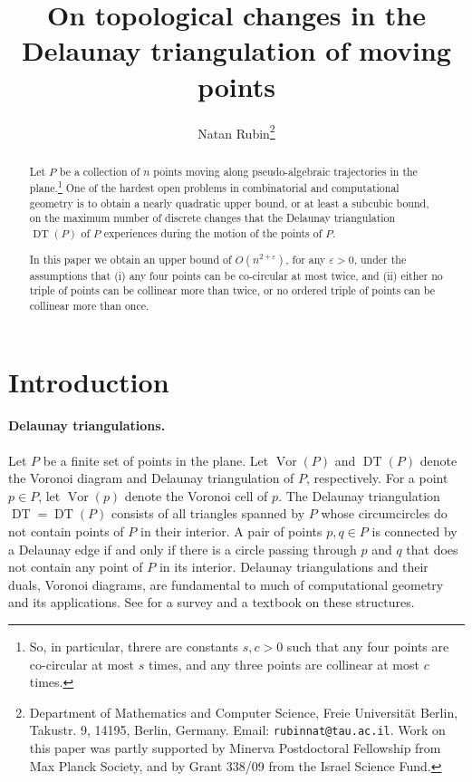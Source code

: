 \documentclass[letter,11pt]{article}
\def\eps{{\varepsilon}}
\def\eps{{\varepsilon}}
\def\DT{\mathop{\mathrm{DT}}}
\def\Vor{\mathop{\mathrm{Vor}}}
\begin{document}
\title{On topological changes in the Delaunay triangulation of moving points}
\author{Natan Rubin\thanks{Department of Mathematics and Computer Science, Freie Universit\"{a}t Berlin, Takustr. 9, 14195, Berlin, Germany.
Email: {\tt rubinnat@tau.ac.il}. Work on this paper was partly supported by Minerva Postdoctoral Fellowship from Max Planck Society, and by Grant 338/09 from the Israel Science Fund.}}


\maketitle
\begin{abstract}
Let $P$ be a collection of $n$ points moving along pseudo-algebraic trajectories in the plane.\footnote{So, in particular, threre are constants $s,c>0$ such that any four points are co-circular at most $s$ times, and any three points are collinear at most $c$ times.} 
One of the hardest open problems in combinatorial and computational geometry is to obtain a nearly quadratic upper bound, or at least a subcubic bound, on the maximum number of discrete changes that the Delaunay triangulation $\DT(P)$ of $P$ experiences during the motion of the points of $P$.

In this paper we obtain an upper bound of $O(n^{2+\eps})$, for any $\eps>0$, under the assumptions that (i) any four points can be co-circular at most twice, and (ii) either no triple of points can be collinear more than twice, or no ordered triple of points can be collinear more than once.
\end{abstract}

\section{Introduction}\label{Sec:Intro}
\paragraph{Delaunay triangulations.} 
Let $P$ be a finite set of points in the plane. 
Let $\Vor(P)$ and $\DT(P)$ denote the Voronoi diagram and Delaunay
triangulation of $P$, respectively. For a point $p \in P$, let
$\Vor(p)$ denote the Voronoi cell of $p$. 
The Delaunay triangulation $\DT=\DT(P)$ consists of all 
triangles spanned by $P$ whose circumcircles do not contain points of $P$ in their
interior. A pair of points $p,q\in P$ is connected by a Delaunay edge if and only if
there is a circle passing through $p$
and $q$ that does not contain any point of $P$ in its interior.
Delaunay triangulations and  their duals, Voronoi diagrams, are fundamental to much 
of computational geometry and its applications. 
See \cite{AK,Ed2} for a survey and a
textbook on these structures.
\end{document}
